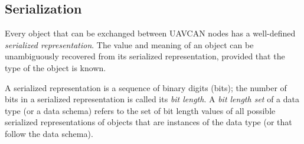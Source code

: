 \subsection{Serialization}

Every object that can be exchanged between UAVCAN nodes has a well-defined \emph{serialized representation}.
The value and meaning of an object can be unambiguously recovered from its serialized representation,
provided that the type of the object is known.

\label{sec:dsdl_bit_length_set}
A serialized representation is a sequence of binary digits (bits);
the number of bits in a serialized representation is called its \emph{bit length}.
A \emph{bit length set} of a data type (or a data schema) refers to the set of bit length values of all possible
serialized representations of objects that are instances of the data type (or that follow the data schema).
